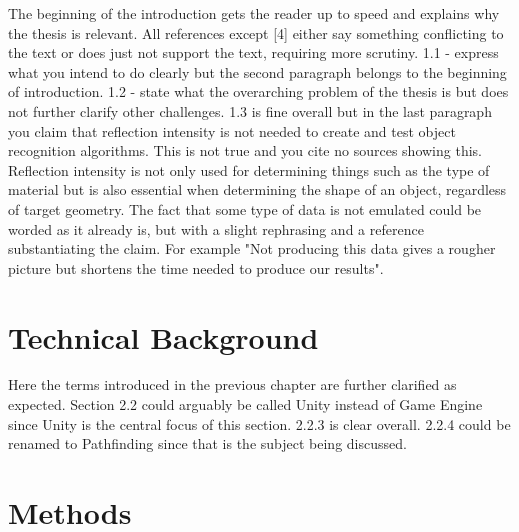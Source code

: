 \documentclass[12pt,a4paper,twoside,openright]{report}
\begin{document}
	The beginning of the introduction gets the reader up to speed and explains
	why the thesis is relevant. All references except [4] either say something
	conflicting to the text or does just not support the text, requiring more 
	scrutiny. 1.1 - express what you intend to do clearly but the second 
	paragraph belongs to the beginning of introduction. 1.2 - state what the
	overarching problem of the thesis is but does not further clarify other
	challenges. 1.3 is fine overall but in the last paragraph you claim that
	reflection intensity is not needed	to create and test object recognition
	algorithms. This is not true and you cite no sources showing this.
	Reflection intensity is not only used for determining things such as the
	type of material but is also essential when determining the shape of an
	object, regardless of target geometry. The fact that some type of data is
	not emulated could be worded as it already is, but with a slight rephrasing
	and a reference substantiating the claim. For example "Not producing this
	data gives a rougher picture but shortens the time needed to produce our
	results".

\section*{Technical Background}

	Here the terms introduced in the previous chapter are further clarified as
	expected. Section 2.2 could arguably be called Unity instead of Game Engine
	since Unity is the central focus of this section. 2.2.3 is clear overall.
	2.2.4 could be renamed to Pathfinding since that is the subject being
	discussed. 

\section*{Methods}
\end{document}
